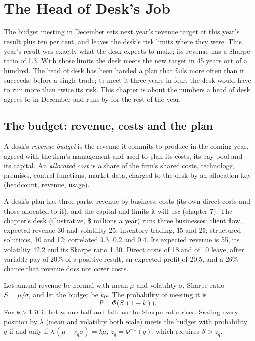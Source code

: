\chapter{The Head of Desk's Job}\label{ch:fm:the-head-of-desks-job}

The budget meeting in December sets next year's revenue target at this year's result plus ten per cent, and leaves the desk's risk limits where
they were. This year's result was exactly what the desk expects to make; its revenue has a Sharpe ratio of 1.3. With those limits the desk meets
the new target in 45 years out of a hundred. The head of desk has been handed a plan that fails more often than it succeeds, before a single
trade; to meet it three years in four, the desk would have to run more than twice its risk. This chapter is about the numbers a head of desk
agrees to in December and runs by for the rest of the year.

\section{The budget: revenue, costs and the plan}

\begin{definition}\label{def:fm:the-head-of-desks-job:budget}
A desk's \emph{revenue budget} is the revenue it commits to produce in the coming year, agreed with the firm's management
and used to plan its costs, its pay pool and its capital. An \emph{allocated cost} is a share of the firm's shared costs,
technology, premises, control functions, market data, charged to the desk by an allocation key (headcount, revenue, usage).
\end{definition}

A desk's plan has three parts: revenue by business, costs (its own direct costs and those allocated to it), and the capital and limits it will use
(chapter 7). The chapter's desk (illustrative, \$ millions a year) runs three businesses: client flow, expected revenue 30 and volatility 25;
inventory trading, 15 and 20; structured solutions, 10 and 12; correlated 0.3, 0.2 and 0.4. Its expected revenue is 55, its volatility 42.2
and its Sharpe ratio 1.30. Direct costs of 18 and  of 10 leave, after variable pay of 20\% of a positive result, an expected
profit of 20.5, and a 26\% chance that revenue does not cover costs.

\begin{proposition}\label{prop:fm:the-head-of-desks-job:target}
Let annual revenue be normal with mean $\mu$ and volatility $\sigma$, Sharpe ratio $S=\mu/\sigma$, and let the budget be $k\mu$. The probability of
meeting it is
\[
P=\Phi\bigl(S\,(1-k)\bigr).
\]
For $k>1$ it is below one half and falls as the Sharpe ratio rises. Scaling every position by $\lambda$ (mean and volatility both scale) meets the
budget with probability $q$ if and only if $\lambda\,(\mu-z_q\sigma)=k\mu$, $z_q=\Phi^{-1}(q)$, which requires $S>z_q$.
\end{proposition}

